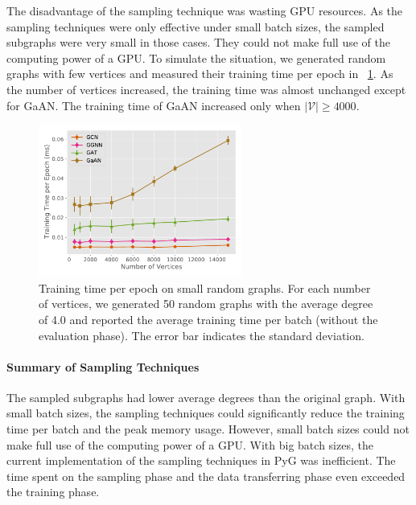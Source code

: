 The disadvantage of the sampling technique was wasting GPU resources.
%
As the sampling techniques were only effective under small batch sizes, the sampled subgraphs were very small in those cases.
%
They could not make full use of the computing power of a GPU.
%
To simulate the situation, we generated random graphs with few vertices and measured their training time per epoch in \figurename~\ref{fig:exp_small_graph_train_time}.
%
As the number of vertices increased, the training time was almost unchanged except for GaAN.
%
The training time of GaAN increased only when $|\mathcal{V}| \geq 4000$.

\begin{figure}[H]
    \centering
    \includegraphics[height=5cm]{figs/experiments/exp_small_graph_train_time.pdf}
    \caption{Training time per epoch on small random graphs. For each number of vertices, we generated 50 random graphs with the average degree of 4.0 and reported the average training time per batch (without the evaluation phase). The error bar indicates the standard deviation.}
    \label{fig:exp_small_graph_train_time}
\end{figure}

\paragraph{Summary of Sampling Techniques}

The sampled subgraphs had lower average degrees than the original graph.
%
With small batch sizes, the sampling techniques could significantly reduce the training time per batch and the peak memory usage.
%
However, small batch sizes could not make full use of the computing power of a GPU.
%
With big batch sizes, the current implementation of the sampling techniques in PyG was inefficient.
%
The time spent on the sampling phase and the data transferring phase even exceeded the training phase.

